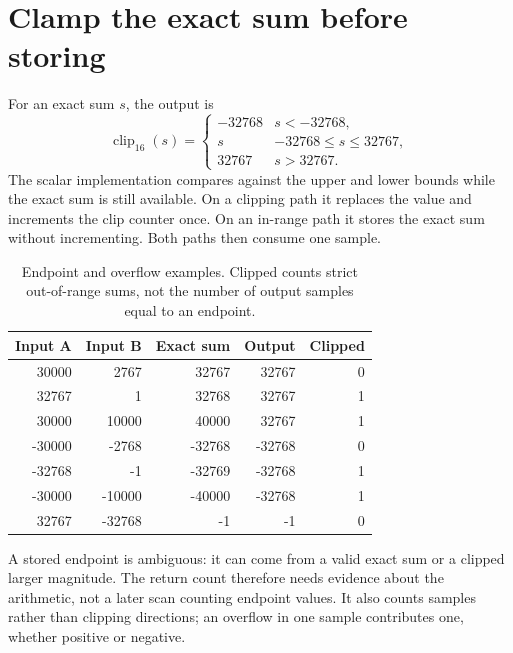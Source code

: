\section{Clamp the exact sum before storing}\label{pcm-saturation}
For an exact sum $s$, the output is
\[
  \operatorname{clip}_{16}(s)=
  \begin{cases}
    -32768 & s<-32768,              \\
    s      & -32768\leq s\leq32767, \\
    32767  & s>32767.
  \end{cases}
\]
The scalar implementation compares against the upper and lower bounds while the
exact sum is still available. On a clipping path it replaces the value and increments
the clip counter once. On an in-range path it stores the exact sum without incrementing.
Both paths then consume one sample.

\begin{table}[htbp]
  \centering
  \caption{Endpoint and overflow examples. Clipped counts strict out-of-range sums, not the number of output samples equal to an endpoint.}
  \begin{tabular}{rrrrr}
    \toprule
    Input A & Input B & Exact sum & Output & Clipped \\
    \midrule
    30000   & 2767    & 32767     & 32767  & 0       \\
    32767   & 1       & 32768     & 32767  & 1       \\
    30000   & 10000   & 40000     & 32767  & 1       \\
    -30000  & -2768   & -32768    & -32768 & 0       \\
    -32768  & -1      & -32769    & -32768 & 1       \\
    -30000  & -10000  & -40000    & -32768 & 1       \\
    32767   & -32768  & -1        & -1     & 0       \\
    \bottomrule
  \end{tabular}
\end{table}

A stored endpoint is ambiguous: it can come from a valid exact sum or a clipped
larger magnitude. The return count therefore needs evidence about the arithmetic,
not a later scan counting endpoint values. It also counts samples rather than
clipping directions; an overflow in one sample contributes one, whether positive
or negative.

